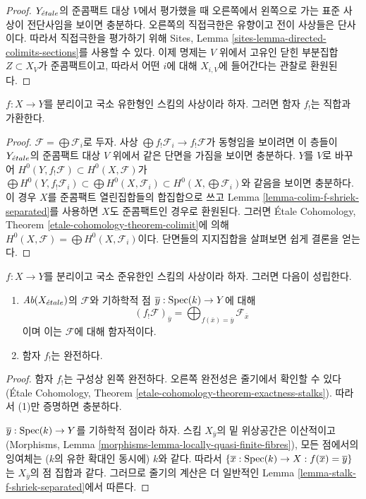\begin{proof}
$Y_{\acute{e}tale}$의 준콤팩트 대상 $V$에서 평가했을 때 오른쪽에서 왼쪽으로
가는 표준 사상이 전단사임을 보이면 충분하다. 오른쪽의 직접극한은
유향이고 전이 사상들은 단사이다. 따라서 직접극한을 평가하기 위해
Sites, Lemma \ref{sites-lemma-directed-colimits-sections}를 사용할 수
있다. 이제 명제는 $V$ 위에서 고유인 닫힌 부분집합
$Z \subset X_V$가 준콤팩트이고, 따라서 어떤 $i$에 대해
$X_{i,V}$에 들어간다는 관찰로 환원된다.
\end{proof}

\begin{lemma}
\label{lemma-f-shriek-separated-direct-sums}
$f : X \to Y$를 분리이고 국소 유한형인 스킴의 사상이라 하자.
그러면 함자 $f_!$는 직합과 가환한다.
\end{lemma}

\begin{proof}
$\mathcal{F} = \bigoplus \mathcal{F}_i$로 두자. 사상
$\bigoplus f_!\mathcal{F}_i \to f_!\mathcal{F}$가 동형임을 보이려면
이 층들이 $Y_{\acute{e}tale}$의 준콤팩트 대상 $V$ 위에서 같은 단면을 가짐을
보이면 충분하다. $Y$를 $V$로 바꾸어
$H^0(Y,f_!\mathcal{F}) \subset H^0(X,\mathcal{F})$가
$\bigoplus H^0(Y, f_!\mathcal{F}_i)
\subset \bigoplus H^0(X, \mathcal{F}_i)
\subset H^0(X, \bigoplus \mathcal{F}_i)$와 같음을 보이면 충분하다.
이 경우 $X$를 준콤팩트 열린집합들의
합집합으로 쓰고 Lemma \ref{lemma-colim-f-shriek-separated}를 사용하면
$X$도 준콤팩트인 경우로 환원된다. 그러면 \'Etale Cohomology,
Theorem \ref{etale-cohomology-theorem-colimit}에 의해
$H^0(X,\mathcal{F}) = \bigoplus H^0(X,\mathcal{F}_i)$이다.
단면들의 지지집합을 살펴보면 쉽게 결론을 얻는다.
\end{proof}

\begin{lemma}
\label{lemma-lqf-f-shriek-separated-colimits}
$f : X \to Y$를 분리이고 국소 준유한인 스킴의 사상이라 하자.
그러면 다음이 성립한다.
\begin{enumerate}
\item $\textit{Ab}(X_{\acute{e}tale})$의 $\mathcal{F}$와 기하학적 점
$\overline{y} : \mathop{\mathrm{Spec}}(k) \to Y$에 대해
$$
(f_!\mathcal{F})_{\overline{y}} =
\bigoplus\nolimits_{f(\overline{x}) = \overline{y}} \mathcal{F}_{\overline{x}}
$$
이며 이는 $\mathcal{F}$에 대해 함자적이다.
\item 함자 $f_!$는 완전하다.
\end{enumerate}
\end{lemma}

\begin{proof}
함자 $f_!$는 구성상 왼쪽 완전하다. 오른쪽 완전성은 줄기에서 확인할 수
있다(\'Etale Cohomology, Theorem
\ref{etale-cohomology-theorem-exactness-stalks}). 따라서 (1)만
증명하면 충분하다.

\medskip\noindent
$\overline{y} : \mathop{\mathrm{Spec}}(k) \to Y$를 기하학적 점이라 하자.
스킴 $X_{\overline{y}}$의 밑 위상공간은 이산적이고
(Morphisms, Lemma
\ref{morphisms-lemma-locally-quasi-finite-fibres}), 모든 점에서의
잉여체는 ($k$의 유한 확대인 동시에) $k$와 같다. 따라서
$\{\overline{x} : \mathop{\mathrm{Spec}}(k) \to X :
f(\overline{x}) = \overline{y}\}$는 $X_{\overline{y}}$의 점 집합과
같다. 그러므로 줄기의 계산은 더 일반적인 Lemma
\ref{lemma-stalk-f-shriek-separated}에서 따른다.
\end{proof}


